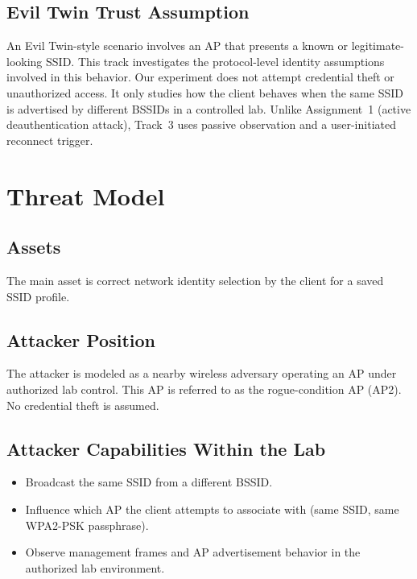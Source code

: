 \documentclass[12pt,a4paper]{article}
\begin{document}
\subsection{Evil Twin Trust Assumption}

An Evil Twin-style scenario involves an AP that presents a known or legitimate-looking SSID. This track investigates the protocol-level identity assumptions involved in this behavior. Our experiment does not attempt credential theft or unauthorized access. It only studies how the client behaves when the same SSID is advertised by different BSSIDs in a controlled lab. Unlike Assignment~1 (active deauthentication attack), Track~3 uses passive observation and a user-initiated reconnect trigger.

\section{Threat Model}

\subsection{Assets}

The main asset is correct network identity selection by the client for a saved SSID profile.

\subsection{Attacker Position}

The attacker is modeled as a nearby wireless adversary operating an AP under authorized lab control. This AP is referred to as the rogue-condition AP (AP2). No credential theft is assumed.

\subsection{Attacker Capabilities Within the Lab}

\begin{itemize}
    \item Broadcast the same SSID from a different BSSID.
    \item Influence which AP the client attempts to associate with (same SSID, same WPA2-PSK passphrase).
    \item Observe management frames and AP advertisement behavior in the authorized lab environment.
\end{itemize}
\end{document}
